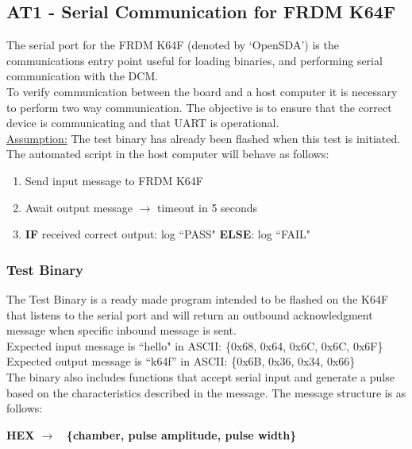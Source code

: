 \documentclass[]{article}
\begin{document}
\subsection{AT1 - Serial Communication for FRDM K64F}
The serial port for the FRDM K64F (denoted by `OpenSDA') is the communications entry point useful for loading binaries, and performing serial communication with the DCM.\\

To verify communication between the board and a host computer it is necessary to perform two way communication. The objective is to ensure that the correct device is communicating and that UART is operational. \\

\underline{Assumption:} The test binary has already been flashed when this test is initiated.\\

The automated script in the host computer will behave as follows:
\begin{enumerate}
	\item Send input message to FRDM K64F
	\item Await output message $\rightarrow$ timeout in 5 seconds
	\item \textbf{IF} received correct output: log ``PASS" \textbf{ELSE}: log ``FAIL"
\end{enumerate}

\subsubsection{Test Binary}\label{sec:test_bin_k64f}
The Test Binary is a ready made program intended to be flashed on the K64F that listens to the serial port and will return an outbound acknowledgment message when specific inbound message is sent.\\

Expected input message is ``hello" in ASCII: \{0x68, 0x64, 0x6C, 0x6C, 0x6F\}\\
Expected output message is ``k64f'' in ASCII: \{0x6B, 0x36, 0x34, 0x66\}\\

The binary also includes functions that accept serial input and generate a pulse based on the characteristics described in the message. The message structure is as follows:\\

\begin{center}
	\textbf{HEX $\rightarrow$ \ \{chamber, pulse amplitude, pulse width\}}\\
\end{center}
\end{document}
